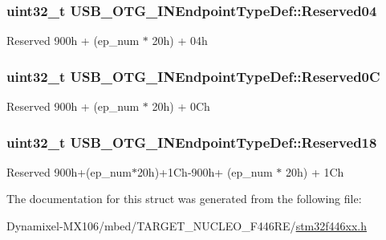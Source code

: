 \subsubsection[{\texorpdfstring{Reserved04}{Reserved04}}]{\setlength{\rightskip}{0pt plus 5cm}uint32\+\_\+t U\+S\+B\+\_\+\+O\+T\+G\+\_\+\+I\+N\+Endpoint\+Type\+Def\+::\+Reserved04}\hypertarget{struct_u_s_b___o_t_g___i_n_endpoint_type_def_ab40b947e437eea142bb6682282b073d6}{}\label{struct_u_s_b___o_t_g___i_n_endpoint_type_def_ab40b947e437eea142bb6682282b073d6}
Reserved 900h + (ep\+\_\+num $\ast$ 20h) + 04h 
\subsubsection[{\texorpdfstring{Reserved0C}{Reserved0C}}]{\setlength{\rightskip}{0pt plus 5cm}uint32\+\_\+t U\+S\+B\+\_\+\+O\+T\+G\+\_\+\+I\+N\+Endpoint\+Type\+Def\+::\+Reserved0C}\hypertarget{struct_u_s_b___o_t_g___i_n_endpoint_type_def_a30c3ab77aa3174965375dfe1a01bdddb}{}\label{struct_u_s_b___o_t_g___i_n_endpoint_type_def_a30c3ab77aa3174965375dfe1a01bdddb}
Reserved 900h + (ep\+\_\+num $\ast$ 20h) + 0\+Ch 
\subsubsection[{\texorpdfstring{Reserved18}{Reserved18}}]{\setlength{\rightskip}{0pt plus 5cm}uint32\+\_\+t U\+S\+B\+\_\+\+O\+T\+G\+\_\+\+I\+N\+Endpoint\+Type\+Def\+::\+Reserved18}\hypertarget{struct_u_s_b___o_t_g___i_n_endpoint_type_def_a525d6997cba563967fd7ea22898ed4f6}{}\label{struct_u_s_b___o_t_g___i_n_endpoint_type_def_a525d6997cba563967fd7ea22898ed4f6}
Reserved 900h+(ep\+\_\+num$\ast$20h)+1\+Ch-\/900h+ (ep\+\_\+num $\ast$ 20h) + 1\+Ch 

The documentation for this struct was generated from the following file\+:\begin{DoxyCompactItemize}
\item 
Dynamixel-\/\+M\+X106/mbed/\+T\+A\+R\+G\+E\+T\+\_\+\+N\+U\+C\+L\+E\+O\+\_\+\+F446\+R\+E/\hyperlink{stm32f446xx_8h}{stm32f446xx.\+h}\end{DoxyCompactItemize}
